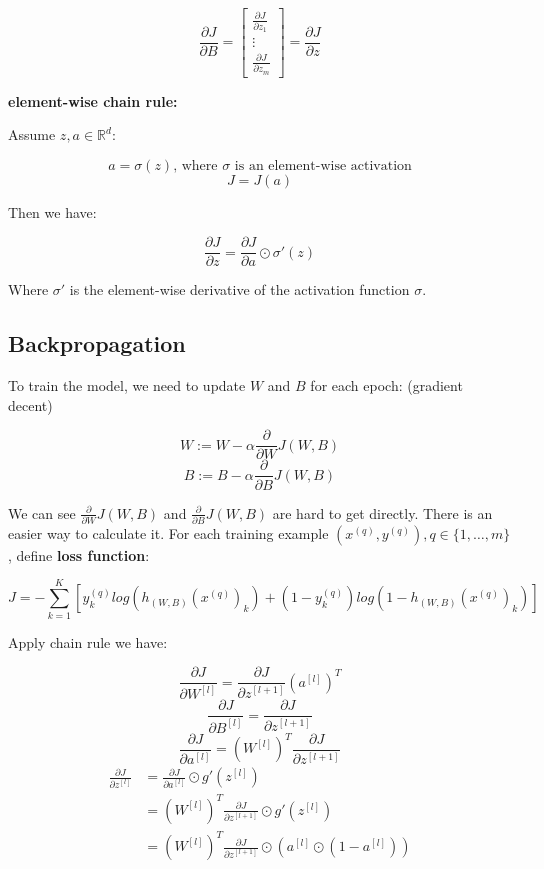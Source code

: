 \documentclass{article}
\begin{document}
\[
\frac{\partial J}{\partial B} = 
\begin{bmatrix}
\frac{\partial J}{\partial z_1}\\
\vdots\\
\frac{\partial J}{\partial z_m}
\end{bmatrix}
= \frac{\partial J}{\partial z}
\]

\noindent \textbf{element-wise chain rule:}

\noindent Assume \(z, a \in \mathbb{R}^d\):

\[a = \sigma(z) \text{, where \(\sigma\) is an element-wise activation}\]
\[J = J(a)\]

\noindent Then we have:

\[\frac{\partial J}{\partial z} = \frac{\partial J}{\partial a} \odot \sigma'(z)\]

\noindent Where \(\sigma'\) is the element-wise derivative of the activation function \(\sigma\).

\subsection{Backpropagation}

\noindent To train the model, we need to update \(W\) and \(B\) for each epoch: (gradient decent)

\[W := W - \alpha  \frac{\partial}{\partial W} J(W, B)\]
\[B := B - \alpha  \frac{\partial}{\partial B} J(W, B)\]

\noindent We can see \(\frac{\partial}{\partial W} J(W, B)\) and \(\frac{\partial}{\partial B} J(W, B)\) are hard to get directly. There is an easier way to calculate it. For each training example \((x^{(q)}, y^{(q)}), q \in \{1, \dots, m\}\), define \textbf{loss function}:

\[J = -\sum_{k = 1}^{K} [y^{(q)}_k log(h_{(W, B)} (x^{(q)})_k) + (1 - y^{(q)}_k) log(1 - h_{(W, B)}(x^{(q)})_k)] \]

\noindent Apply chain rule we have:

\[\frac{\partial J}{\partial W^{[l]}} = \frac{\partial J}{\partial z^{[l + 1]}} (a^{[l]})^T\]
\[\frac{\partial J}{\partial B^{[l]}} = \frac{\partial J}{\partial z^{[l + 1]}}\]
\[\frac{\partial J}{\partial a^{[l]}} = (W^{[l]})^T \frac{\partial J}{\partial z^{[l + 1]}}\]
\begin{equation*}
\begin{split}
\frac{\partial J}{\partial z^{[l]}}
& = \frac{\partial J}{\partial a^{[l]}} \odot g'(z^{[l]}) \\
& = (W^{[l]})^T \frac{\partial J}{\partial z^{[l + 1]}} \odot g'(z^{[l]}) \\
& = (W^{[l]})^T \frac{\partial J}{\partial z^{[l + 1]}} \odot (a^{[l]} \odot (1 - a^{[l]}))
\end{split}
\end{equation*}
\end{document}

